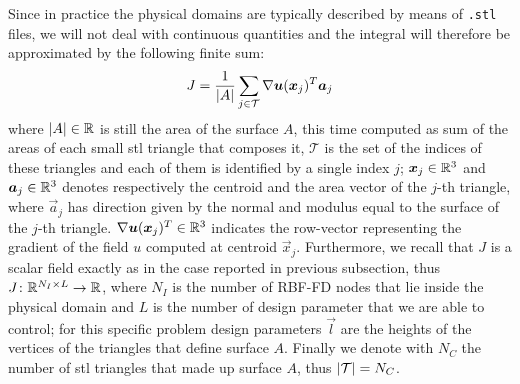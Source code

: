 Since in practice the physical domains are typically described by means of \verb*|.stl| files, we will not deal with continuous quantities and the integral will therefore be approximated by the following finite sum:
\begin{equation}
	J = \frac{1}{\lvert A\rvert} \sum_{j \in \mathcal{T}} \nabla \boldsymbol{u}(\boldsymbol{x}_j)^T \boldsymbol{a}_j
\end{equation}
where $\lvert A\rvert \in \mathbb{R}$ is still the area of the surface $A$, this time computed as sum of the areas of each small stl triangle that composes it, $\mathcal{T}$ is the set of the indices of these triangles and each of them is identified by a single index $j$; $\boldsymbol{x}_j \in \mathbb{R}^3$ and $\boldsymbol{a}_j \in \mathbb{R}^3$ denotes respectively the centroid and the area vector of the $j$-th triangle, where $\vec{a}_j$ has direction given by the normal and modulus equal to the surface of the $j$-th triangle.
$\nabla \boldsymbol{u}(\boldsymbol{x}_j)^T \in \mathbb{R}^3$ indicates the row-vector representing the gradient of the field $u$ computed at centroid $\vec{x}_j$.
Furthermore, we recall that $J$ is a scalar field exactly as in the case reported in previous subsection, thus $J \colon \mathbb{R}^{N_I \times L} \to \mathbb{R}$, where $N_I$ is the number of RBF-FD nodes that lie inside the physical domain and $L$ is the number of design parameter that we are able to control; for this specific problem design parameters $\vec{l}$ are the heights of the vertices of the triangles that define surface $A$. Finally we denote with $N_C$ the number of stl triangles that made up surface $A$, thus $\lvert\mathcal{T}\rvert = N_C$.


